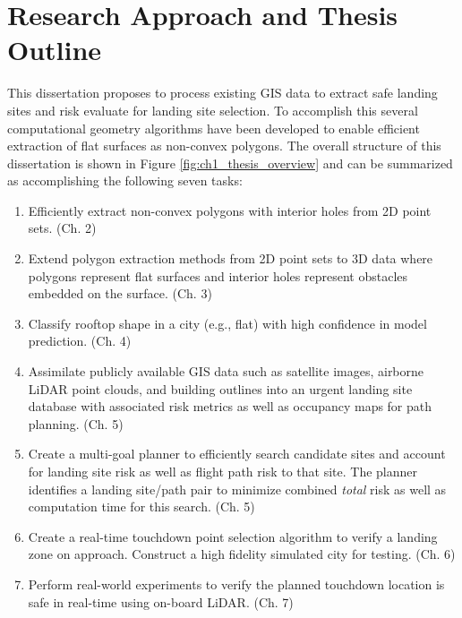 \section{Research Approach and Thesis Outline}


This dissertation proposes to process existing \ac{GIS} data to extract safe landing sites and risk evaluate for landing site selection. To accomplish this several computational geometry algorithms have been developed to enable efficient extraction of flat surfaces as non-convex polygons. The overall structure of this dissertation is shown in Figure \ref{fig:ch1_thesis_overview} and can be summarized as accomplishing the following seven tasks:

\begin{enumerate}[noitemsep]
    \item Efficiently extract non-convex polygons with interior holes from 2D point sets. (Ch. 2)
    \item Extend polygon extraction methods from 2D point sets to 3D data where polygons represent flat surfaces and interior holes represent obstacles embedded on the surface. (Ch. 3)
    \item Classify rooftop shape in a city (e.g., flat) with high confidence in model prediction. (Ch. 4)
    \item Assimilate publicly available GIS data such as satellite images, airborne LiDAR point clouds, and building outlines into an urgent landing site database with associated risk metrics as well as occupancy maps for path planning. (Ch. 5)
    \item Create a multi-goal planner to efficiently search candidate sites and account for landing site risk as well as flight path risk to that site. The planner identifies a landing site/path pair to minimize combined \emph{total} risk as well as computation time for this search. (Ch. 5)
    \item Create a real-time touchdown point selection algorithm to verify a landing zone on approach. Construct a high fidelity simulated city for testing. (Ch. 6)
    \item Perform real-world experiments to verify the planned touchdown location is safe in real-time using on-board \ac{LiDAR}. (Ch. 7)
\end{enumerate}

